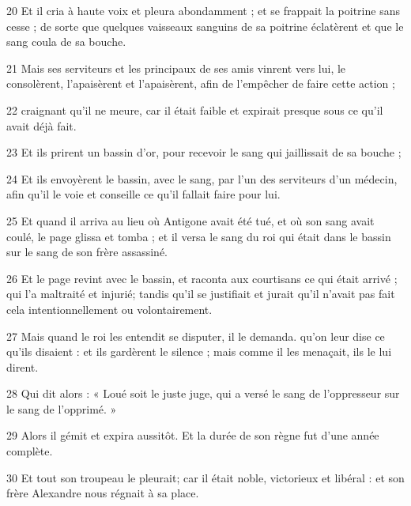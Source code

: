 \par 20 Et il cria à haute voix et pleura abondamment ; et se frappait la poitrine sans cesse ; de sorte que quelques vaisseaux sanguins de sa poitrine éclatèrent et que le sang coula de sa bouche.

\par 21 Mais ses serviteurs et les principaux de ses amis vinrent vers lui, le consolèrent, l'apaisèrent et l'apaisèrent, afin de l'empêcher de faire cette action ;

\par 22 craignant qu'il ne meure, car il était faible et expirait presque sous ce qu'il avait déjà fait.

\par 23 Et ils prirent un bassin d'or, pour recevoir le sang qui jaillissait de sa bouche ;

\par 24 Et ils envoyèrent le bassin, avec le sang, par l'un des serviteurs d'un médecin, afin qu'il le voie et conseille ce qu'il fallait faire pour lui.

\par 25 Et quand il arriva au lieu où Antigone avait été tué, et où son sang avait coulé, le page glissa et tomba ; et il versa le sang du roi qui était dans le bassin sur le sang de son frère assassiné.

\par 26 Et le page revint avec le bassin, et raconta aux courtisans ce qui était arrivé ; qui l'a maltraité et injurié; tandis qu'il se justifiait et jurait qu'il n'avait pas fait cela intentionnellement ou volontairement.

\par 27 Mais quand le roi les entendit se disputer, il le demanda. qu'on leur dise ce qu'ils disaient : et ils gardèrent le silence ; mais comme il les menaçait, ils le lui dirent.

\par 28 Qui dit alors : « Loué soit le juste juge, qui a versé le sang de l'oppresseur sur le sang de l'opprimé. »

\par 29 Alors il gémit et expira aussitôt. Et la durée de son règne fut d'une année complète.

\par 30 Et tout son troupeau le pleurait; car il était noble, victorieux et libéral : et son frère Alexandre nous régnait à sa place.


